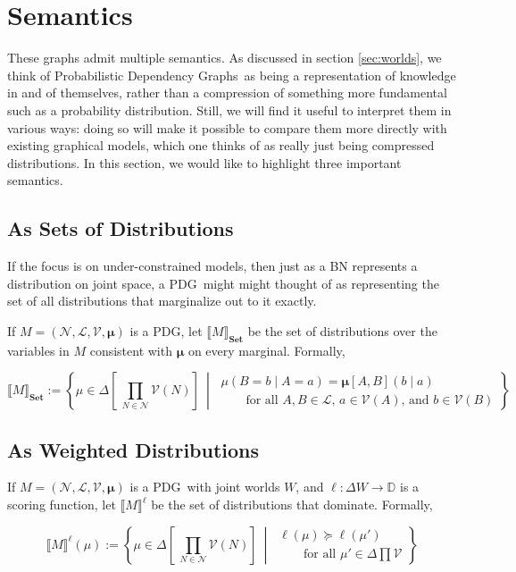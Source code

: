 \documentclass{article}
\newcommand{\modelnames}{Probabilistic Dependency Graphs}
\newcommand{\MN}{PDG}
\newcommand\Set{\textbf{Set}}
\begin{document}
	\section{Semantics}\label{sec:semantics}
	These graphs admit multiple semantics. As discussed in section \ref{sec:worlds}, we think of \modelnames\ as being a representation of knowledge in and of themselves, rather than a compression of something more fundamental such as a probability distribution. Still, we will find it useful to interpret them in various ways: doing so will make it possible to compare them more directly with existing graphical models, which one thinks of as really just being compressed distributions. In this section, we would like to highlight three important semantics.
	
	\subsection{As Sets of Distributions}\label{sec:set-of-distribution-semantics}
	If the focus is on under-constrained models, then just as a BN represents a distribution on joint space, a \MN\ might might thought of as representing the set of all distributions that marginalize out to it exactly. 
	
	\begin{defn}
		If $M = (\mathcal N, \mathcal L, \mathcal V, \boldsymbol\mu)$ is a \MN, let $\llbracket M \rrbracket_\Set$ be the set of distributions over the variables in $M$ consistent with $\boldsymbol\mu$ on every marginal. Formally,
		
		\[ \Big\llbracket M \Big\rrbracket_\Set := \left\{\mu \in \Delta\left[~\prod_{N \in \mathcal N}\mathcal V(N)\right] ~\middle|~
		\begin{array}{l}
		\mu(B = b \mid A = a) = \boldsymbol\mu[A,B](b \mid a) \\[0.2em]
		\qquad\text{for all $A, B \in \mathcal L$, $a \in\mathcal V(A)$, and $b \in \mathcal V(B)$} \end{array} \right\}\]
	\end{defn}	
	

	\subsection{As Weighted Distributions}
	
		
	\begin{defn}
		If $M = (\mathcal N, \mathcal L, \mathcal V, \boldsymbol\mu)$ is a \MN\ with joint worlds $W$, and $\ell: \Delta W \to \mathbb D$ is a scoring function, let $\llbracket M \rrbracket^{\ell}$ be the set of distributions that dominate. Formally,
		
		\[ \Big\llbracket M \Big\rrbracket^{\ell}(\mu) := \left\{\mu \in \Delta\left[~\prod_{N \in \mathcal N}\mathcal V(N)\right] ~\middle|~
		\begin{array}{l}
		 \ell(\mu) \succeq \ell(\mu') \\[0.2em]
		\qquad\text{for all $\mu' \in \Delta \prod \mathcal V$} \end{array} \right\}\]
	\end{defn}
\end{document}
